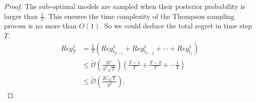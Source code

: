 \begin{theorem}
\begin{proof}
The sub-optimal models are sampled when their posterior probability is larger than $\frac{1}{T}$. This ensures the time complexity of the Thompson sampling process is no more than $O(1)$. So we could deduce the total regret in time step $T$.
\begin{equation}
\begin{aligned}
Reg_{T}^{1} &= \frac{1}{T} (Reg_{t_{T-1}}^{1} + Reg_{t_{T-2}}^{1} + \cdots + Reg_{t_{1}}^{1})\\
&\leq \tilde{\mathcal{O}}(\frac{2C}{S^{2}\sqrt{T}})(\frac{T-1}{T} + \frac{T-2}{T} + \cdots \frac{1}{T})\\
&\leq \tilde{\mathcal{O}}(\frac{2C \sqrt{T}}{S^{2}}).
\end{aligned}
\end{equation}
\end{proof}
\end{theorem}


